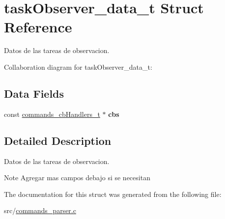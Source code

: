 \hypertarget{structtaskObserver__data__t}{}\section{task\+Observer\+\_\+data\+\_\+t Struct Reference}
\label{structtaskObserver__data__t}


Datos de las tareas de observacion.  




Collaboration diagram for task\+Observer\+\_\+data\+\_\+t\+:
\subsection*{Data Fields}
\begin{DoxyCompactItemize}
\item 
const \hyperlink{structcommands__cbHandlers__t}{commands\+\_\+cb\+Handlers\+\_\+t} $\ast$ {\bfseries cbs}\hypertarget{structtaskObserver__data__t_a09baa80148742cabf3a654ebe495e0fe}{}\label{structtaskObserver__data__t_a09baa80148742cabf3a654ebe495e0fe}

\end{DoxyCompactItemize}


\subsection{Detailed Description}
Datos de las tareas de observacion. 

\begin{DoxyNote}{Note}
Agregar mas campos debajo si se necesitan 
\end{DoxyNote}


The documentation for this struct was generated from the following file\+:\begin{DoxyCompactItemize}
\item 
src/\hyperlink{commands__parser_8c}{commands\+\_\+parser.\+c}\end{DoxyCompactItemize}
